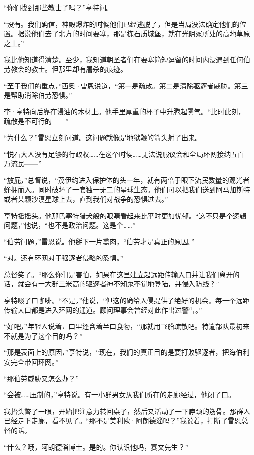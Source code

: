 \documentclass[AutoFakeBold=true]{book}
\begin{document}
``你们找到那些教士了吗？''亨特问。

``没有。我们确信，神殿爆炸的时候他们已经逃脱了，但是当局没法确定他们的位置。据说他们去了北方的时间要塞，那是栋石质城堡，就在光阴冢所处的高地草原之上。''

{\kaishu 我比他知道得清楚。至少，我知道朝圣者们在要塞简短逗留的时间内没遇到任何伯劳教会的教士。但那里却有屠杀的痕迹。}

``至于我们的重点，''西奥·雷恩说道，``第一是疏散。第二是清除驱逐者威胁。第三是帮助消除伯劳恐惧。''

李·亨特向后靠在浸油的木材上。他手里厚重的杯子中升腾起雾气。``此时此刻，疏散是不可行的——''

``为什么？''雷恩立刻问道。这问题就像是地狱鞭的箭头射了出来。

``悦石大人没有足够的行政权……在这个时候……无法说服议会和全局环网接纳五百万流民——''

``放屁，''总督说，``茂伊约进入保护体的头一年，就有两倍于眼下流民数量的观光者蜂拥而入。同时破坏了一套独一无二的星球生态。他们可以把我们送到阿马加斯特或者某颗沙漠星球上去，直到我们对战争的恐惧过去。''

亨特摇摇头。他那巴塞特猎犬般的眼睛看起来比平时更加忧郁。``这不只是个逻辑问题，''他说，``也不是政治问题。这是个……''

``伯劳问题，''雷恩说。他掰下一片熏肉，``伯劳才是真正的原因。''

``对。还有环网对于驱逐者侵略的恐惧。''

总督笑了。``那么你们是害怕，如果在这里建立起远距传输入口并让我们离开的话，就会有一大群三米高的驱逐者神不知鬼不觉地登陆，并侵入防线？''

亨特啜了口咖啡。``不是，''他说，``但这的确给入侵提供了绝好的机会。每一个远距传输人口都是进入环网的通道。顾问理事会曾经对此作出过警告。''

``好吧，''年轻人说着，口里还含着半口食物，``那就用飞船疏散吧。特遣部队最初来不就是为了这个目的吗？''

``那是{\kaishu 表面上}的原因，''亨特说，``现在，我们的真正目的是要打败驱逐者，把海伯利安完全带回环网。''

``那伯劳威胁又怎么办？''

``会被……压制的，''亨特说。有一小群男女从我们所在的走廊经过，他闭了口。

我抬头瞥了一眼，开始把注意力转回桌子，然后又活动了一下脖颈的筋骨。那群人已经走下走廊，看不见了。``那不是美利欧·阿朗德淄吗？''我说着，打断了雷恩总督的话。

``什么？哦，阿朗德淄博士。是的。你认识他吗，赛文先生？''
\end{document}
